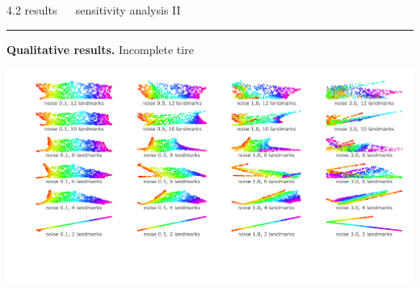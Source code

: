 \documentclass[11pt, compress, t, notes = noshow, xcolor = table, 
aspectratio = 1610]{beamer}
\newcommand{\highlight}[1]{\textcolor{highlightcol}{\textbf{#1}}}
\newcommand{\flexitem}[1]{\item[$\highlight{#1}$]}
\begin{document}

\LARGE
\begin{frame}{\textcolor{gray!90}{4.2 results} ~~ sensitivity analysis II}
\normalsize
\vspace{-0.5cm}
\noindent \textcolor{gray!90}{\rule{\textwidth}{1pt}}
\smallskip

\textbf{Qualitative results.} Incomplete tire

\vspace{0.3cm}

\includegraphics[trim = 40 60 0 0, clip, %
    width = \textwidth]{figures/sensitivity_noise_qual_tire}

\end{frame}


% 
% 
\end{document}
